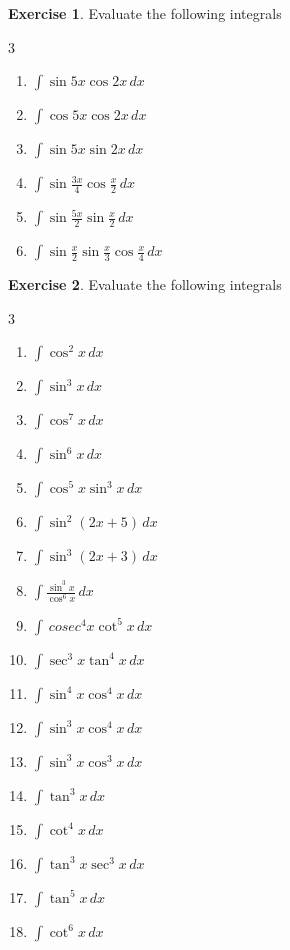 \documentclass{book}
\theoremstyle{definition}
\newtheorem{exercise}{Exercise}[section]
\begin{document}
\begin{exercise}
Evaluate the following integrals
\begin{multicols}{3}
\begin{enumerate}[label=(\roman*)]
    \item $\displaystyle\int \sin 5x\cos 2x\,dx$
    \item $\displaystyle\int\cos 5x\cos 2x \, dx$
    \item $\displaystyle\int\sin 5x\sin 2x\, dx$
    \item $\displaystyle\int \sin\frac{3x}{4}\cos \frac{x}{2} \, dx$
    \item $\displaystyle\int \sin \frac{5x}{2}\sin \frac{x}{2}\, dx$
    \item $\displaystyle\int\sin \frac{x}{2}\sin \frac{x}{3}\cos \frac{x}{4}\, dx$

\end{enumerate} 
\end{multicols}  
\end{exercise}

\begin{exercise}
Evaluate the following integrals
\begin{multicols}{3}
\begin{enumerate}[label=(\roman*)]
    \item $\displaystyle\int \cos^2 x \, dx$
    \item $\displaystyle\int\sin^3 x \, dx$
    \item $\displaystyle\int\cos^7 x\, dx$
    \item $\displaystyle\int\sin^6 x\, dx$
    \item $\displaystyle\int\cos^5 x\sin^3 x\, dx$
    \item $\displaystyle\int \sin^2 (2x+5)\,dx$
    \item $\displaystyle\int \sin^3 (2x+3)\,dx$
    \item $\displaystyle\int\frac{\sin^3 x}{\cos^6 x}\, dx$
    \item $\displaystyle\int\ cosec ^4 x\cot^5 x\, dx$
    \item $\displaystyle\int \sec^3x\tan^4 x \, dx$
    \item $\displaystyle\int \sin^4 x\cos^4 x\, dx$
    \item $\displaystyle\int\sin^3 x\cos^4 x\, dx$
    \item $\displaystyle\int\sin^3 x\cos^3 x\, dx$
    \item $\displaystyle\int\tan^3 x\,dx$
    \item $\displaystyle\int\cot^4 x\, dx$
    \item $\displaystyle\int\tan^3 x\sec^3x\, dx$
    \item $\displaystyle\int \tan^5 x\, dx$
    \item $\displaystyle\int \cot^6 x\, dx$

\end{enumerate} 
\end{multicols}    
\end{exercise} 
\newpage
\end{document}
